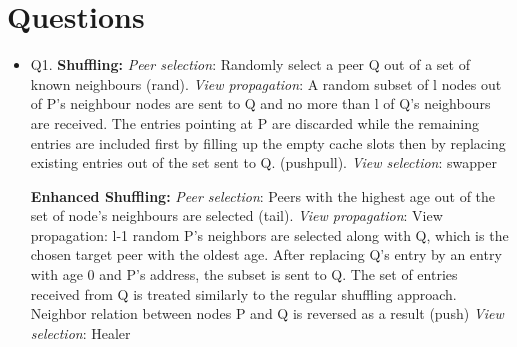 \documentclass[10pt]{proc}
\begin{document}
\section{Questions}

\begin{itemize}
 \item Q1. 
\textbf{Shuffling:}
\emph{Peer selection}: Randomly select a peer Q out of a set of known neighbours (rand).
\emph{View propagation}: A random subset of l nodes out of P's neighbour nodes are sent to Q and no more than l of Q's neighbours are received. The entries pointing at P are discarded while the remaining entries are included first by filling up the empty cache slots then by replacing existing entries out of the set sent to Q. (pushpull).
\emph{View selection}: swapper

\textbf{Enhanced Shuffling:}
\emph{Peer selection}: Peers with the highest age out of the set of node's neighbours are selected (tail).
\emph{View propagation}: View propagation: l-1 random P’s neighbors are selected along with Q, which is the chosen target peer with the oldest age. After replacing Q’s entry by an entry with age 0 and P’s address, the subset is sent to Q. The set of entries received from Q is treated similarly to the regular shuffling approach. Neighbor relation between nodes P and Q is reversed as a result (push)
\emph{View selection}: Healer


\end{itemize}
\end{document}
